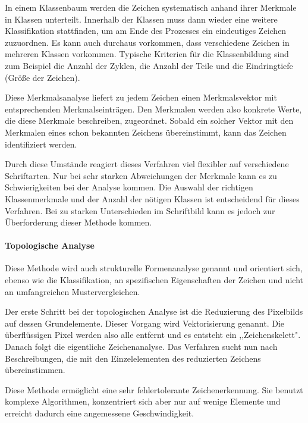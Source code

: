 
In einem Klassenbaum werden die Zeichen systematisch anhand ihrer Merkmale in Klassen unterteilt. Innerhalb der Klassen muss dann wieder eine weitere Klassifikation stattfinden, um am Ende des Prozesses ein eindeutiges Zeichen zuzuordnen. Es kann auch durchaus vorkommen, dass verschiedene Zeichen in mehreren Klassen vorkommen. Typische Kriterien für die Klassenbildung sind zum Beispiel die Anzahl der Zyklen, die Anzahl der Teile und die Eindringtiefe (Größe der Zeichen). \cite{OCRB}

Diese Merkmalsanalyse liefert zu jedem Zeichen einen Merkmalsvektor mit entsprechenden Merkmalseinträgen. Den Merkmalen werden also konkrete Werte, die diese Merkmale beschreiben, zugeordnet. Sobald ein solcher Vektor mit den Merkmalen eines schon bekannten Zeichens übereinstimmt, kann das Zeichen identifiziert werden. \cite{OCRB}

Durch diese Umstände reagiert dieses Verfahren viel flexibler auf verschiedene Schriftarten. Nur bei sehr starken Abweichungen der Merkmale kann es zu Schwierigkeiten bei der Analyse kommen. Die Auswahl der richtigen Klassenmerkmale und der Anzahl der nötigen Klassen ist entscheidend für dieses Verfahren. Bei zu starken Unterschieden im Schriftbild kann es jedoch zur Überforderung dieser Methode kommen. \cite{OCRB}

\paragraph{Topologische Analyse}

Diese Methode wird auch strukturelle Formenanalyse genannt und orientiert sich, ebenso wie die Klassifikation, an spezifischen Eigenschaften der Zeichen und nicht an umfangreichen Mustervergleichen.

Der erste Schritt bei der topologischen Analyse ist die Reduzierung des Pixelbilds auf dessen Grundelemente. Dieser Vorgang wird Vektorisierung genannt. Die überflüssigen Pixel werden also alle entfernt und es entsteht ein ,,Zeichenskelett". Danach folgt die eigentliche Zeichenanalyse. Das Verfahren sucht nun nach Beschreibungen, die mit den Einzelelementen des reduzierten Zeichens übereinstimmen. \cite{OCRB}


Diese Methode ermöglicht eine sehr fehlertolerante Zeichenerkennung. Sie benutzt komplexe Algorithmen, konzentriert sich aber nur auf wenige Elemente und erreicht dadurch eine angemessene Geschwindigkeit. \cite{OCRB}

